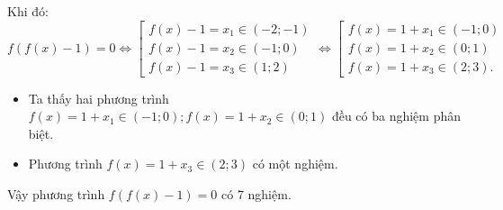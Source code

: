 \begin{ex}
{		Khi đó: $f(f(x)-1)=0 \Leftrightarrow\left[\begin{array}{l}f(x)-1=x_{1} \in(-2 ;-1) \\ f(x)-1=x_{2} \in(-1 ; 0) \\ f(x)-1=x_{3} \in(1 ; 2)\end{array} \Leftrightarrow\left[\begin{array}{l}f(x)=1+x_{1} \in(-1 ; 0) \\ f(x)=1+x_{2} \in(0 ; 1) \\ f(x)=1+x_{3} \in(2 ; 3).\end{array}\right.\right.$
		\begin{itemize}
			\item Ta thấy hai phương trình $f(x)=1+x_{1} \in(-1 ; 0) ; f(x)=1+x_{2} \in(0 ; 1)$ đều có ba nghiệm phân biệt.
			\item		Phương trình $f(x)=1+x_{3} \in(2 ; 3)$ có một nghiệm.
		\end{itemize}		
		Vậy phương trình $f(f(x)-1)=0$ có 7 nghiệm.		
	}
\end{ex}

